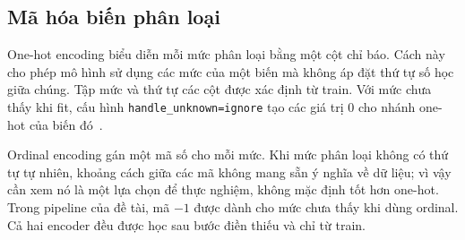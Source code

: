 \subsection{Mã hóa biến phân loại}
\label{subsec:2_2_2}
One-hot encoding biểu diễn mỗi mức phân loại bằng một cột chỉ báo. Cách này cho phép mô hình sử dụng các mức của một biến mà không áp đặt thứ tự số học giữa chúng. Tập mức và thứ tự các cột được xác định từ train. Với mức chưa thấy khi fit, cấu hình \texttt{handle\_unknown=ignore} tạo các giá trị 0 cho nhánh one-hot của biến đó~\cite{sklearn-onehot}.

Ordinal encoding gán một mã số cho mỗi mức. Khi mức phân loại không có thứ tự tự nhiên, khoảng cách giữa các mã không mang sẵn ý nghĩa về dữ liệu; vì vậy cần xem nó là một lựa chọn để thực nghiệm, không mặc định tốt hơn one-hot. Trong pipeline của đề tài, mã $-1$ được dành cho mức chưa thấy khi dùng ordinal. Cả hai encoder đều được học sau bước điền thiếu và chỉ từ train.
